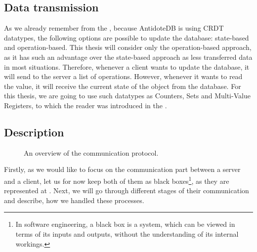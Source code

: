 
\subsection{Data transmission}

As we already remember from the , because AntidoteDB is using CRDT datatypes, the following options are possible to update the database: state-based and operation-based. This thesis will consider only the operation-based approach, as it has such an advantage over the state-based approach as less transferred data in most situations. Therefore, whenever a client wants to update the database, it will send to the server a list of operations. However, whenever it wants to read the value, it will receive the current state of the object from the database. For this thesis, we are going to use such datatypes as Counters, Sets and Multi-Value Registers, to which the reader was introduced in the .

\subsection{Description} 

\begin{figure}[!htb]
    \begin{center}
    \def\svgwidth{0.6\linewidth}
    
    \caption {An overview of the communication protocol.}
    \label{fig:protocol1}
\end{center}
\end{figure}

Firstly, as we would like to focus on the communication part between a server and a client, let us for now keep both of them as black boxes\footnote{In software engineering, a black box is a system, which can be viewed in terms of its inputs and outputs, without the understanding of its internal workings.\cite{49}}, as they are represented at . Next, we will go through different stages of their communication and describe, how we handled these processes. 

